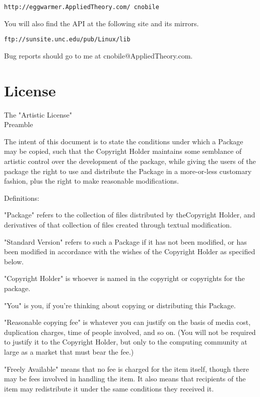 \documentclass[10pt,letterpaper,titlepage]{article}
\newenvironment{lquote}{\begin{list}{}{}\item[]}{\end{list}}
\begin{document}
\begin{alltt}
http://eggwarmer.AppliedTheory.com/~cnobile
\end{alltt}
\vspace{8pt}

\noindent
You will also find the API at the following site and its mirrors.
\vspace{8pt}

\begin{alltt}
ftp://sunsite.unc.edu/pub/Linux/lib
\end{alltt}
\vspace{8pt}

\noindent
Bug reports should go to me at cnobile@AppliedTheory.com.
\pagebreak

\section{License}
\begin{center}
\Large			 The "Artistic License"\\
\vspace{8pt}
\Large				Preamble\\
\end{center}
The intent of this document is to state the conditions under which a Package may be copied, such that the Copyright Holder maintains some semblance of artistic control over the development of the package, while giving the users of the package the right to use and distribute the Package in a more-or-less customary fashion, plus the right to make reasonable modifications.
\vspace{8pt}

\noindent
Definitions:
\begin{lquote}
"Package" refers to the collection of files distributed by the\linebreak Copyright Holder, and derivatives of that collection of files created through textual modification.

"Standard Version" refers to such a Package if it has not been modified, or has been modified in accordance with the wishes of the Copyright Holder as specified below.

"Copyright Holder" is whoever is named in the copyright or copyrights for the package.

"You" is you, if you're thinking about copying or distributing this Package.

"Reasonable copying fee" is whatever you can justify on the basis of media cost, duplication charges, time of people involved, and so on.  (You will not be required to justify it to the Copyright Holder, but only to the computing community at large as a market that must bear the fee.)

"Freely Available" means that no fee is charged for the item itself, though there may be fees involved in handling the item.  It also means that recipients of the item may redistribute it under the same conditions they received it.
\end{lquote}
\end{document}
